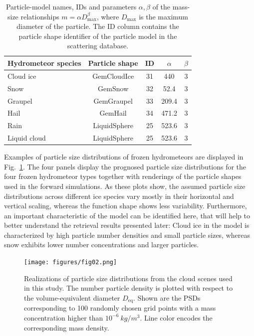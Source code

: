 \documentclass[journal abbreviation, manuscript]{copernicus}
\begin{document}
\begin{table}
  \centering
  \caption{Particle-model names, IDs and parameters $\alpha, \beta$ of the
    mass-size relationships $m = \alpha D_\text{max}^\beta$, where
    $D_\text{max}$ is the maximum diameter of the particle. The ID column
    contains the particle shape identifier of the particle model in the
    \citet{eriksson18} scattering database.}
  \label{tab:species_parameters}
  \begin{tabular}{l|c|c|c|c}
    Hydrometeor species & Particle shape & ID & $\alpha$ & $\beta$ \\
    \hline
    Cloud ice    & GemCloudIce  & 31 & 440   & 3 \\
    Snow         & GemSnow      & 32 & 52.4  & 3 \\
    Graupel      & GemGraupel   & 33 & 209.4 & 3 \\
    Hail         & GemHail      & 34 & 471.2 & 3 \\
    Rain         & LiquidSphere & 25 & 523.6 & 3 \\
    Liquid cloud & LiquidSphere & 25 & 523.6 & 3 \\
  \end{tabular}
\end{table}

Examples of particle size distributions of frozen hydrometeors are displayed in
Fig.~\ref{fig:gem_psds}. The four panels display the prognosed particle size
distributions for the four frozen hydrometeor types together with renderings of
the particle shapes used in the forward simulations. As these plots show, the
assumed particle size distributions across different ice species vary mostly in
their horizontal and vertical scaling, whereas the function shape shows less
variability. Furthermore, an important characteristic of the model can be
identified here, that will help to better understand the retrieval results
presented later: Cloud ice in the model is characterized by high particle number
densities and small particle sizes, whereas snow exhibits lower number
concentrations and larger particles.


\begin{figure}[h!]
\centering \texttt{[image: figures/fig02.png]}
\caption{Realizations of particle size distributions from the cloud scenes used
  in this study. The number particle density is plotted with respect to the
  volume-equivalent diameter $D_\text{eq}$. Shown are the PSDs corresponding to
  100 randomly chosen grid points with a mass concentration higher than
  $10^{-6}\ \unit{kg/m^3}$. Line color encodes the corresponding mass density.}
\label{fig:gem_psds}
\end{figure}
\end{document}
